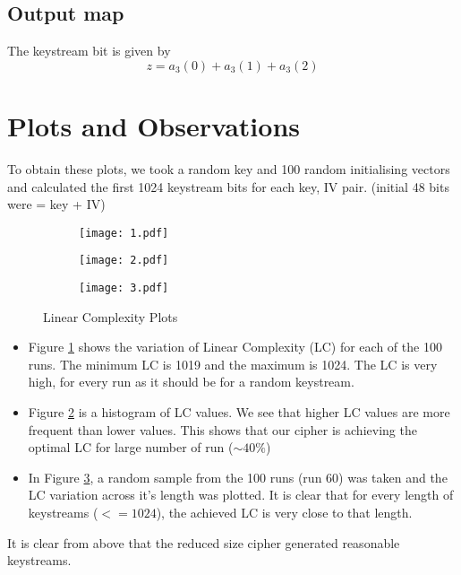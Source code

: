 \documentclass[a4paper,10pt]{article}
\begin{document}
\subsection{Output map}
The keystream bit is given by
\begin{equation}
    z = a_{3}(0) + a_{3}(1) + a_{3}(2)
\end{equation}
\clearpage
\section{Plots and Observations}
To obtain these plots, we took a random key and 100 random initialising vectors and calculated the first 1024 keystream bits for each key, IV pair. (initial 48 bits were = key + IV)
\begin{figure}[H]
    \centering
    \begin{subfigure}{0.7\linewidth}
        \centering
        \texttt{[image: 1.pdf]}
        \caption{}
        \label{fig:1}
    \end{subfigure}
    \begin{subfigure}{0.48\linewidth}
        \centering
        \texttt{[image: 2.pdf]}
        \caption{}
        \label{fig:2}
    \end{subfigure}
    \begin{subfigure}{0.48\linewidth}
        \centering
        \texttt{[image: 3.pdf]}
        \caption{}
        \label{fig:3}
    \end{subfigure}
    \caption{Linear Complexity Plots}
    \label{fig:Q3}
\end{figure}
\begin{itemize}
    \item Figure \ref{fig:1} shows the variation of Linear Complexity (LC) for each of the 100 runs. The minimum LC is 1019 and the maximum is 1024. The LC is very high, for every run as it should be for a random keystream.
    \item Figure \ref{fig:2} is a histogram of LC values. We see that higher LC values are more frequent than lower values. This shows that our cipher is achieving the optimal LC for large number of run ($\sim 40\%$)
    \item In Figure \ref{fig:3}, a random sample from the 100 runs (run 60) was taken and the LC variation across it's length was plotted. It is clear that for every length of keystreams ($<=1024$), the achieved LC is very close to that length.
\end{itemize}
It is clear from above that the reduced size cipher generated reasonable keystreams.
\clearpage
\end{document}
